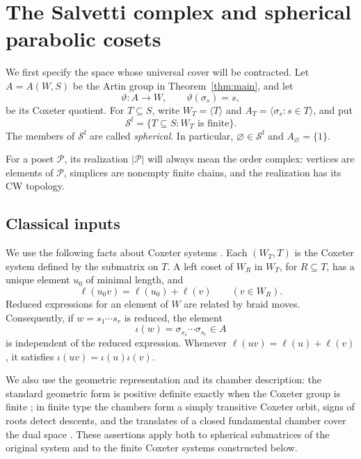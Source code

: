 \section{The Salvetti complex and spherical parabolic cosets}
\label{sec:topology}

We first specify the space whose universal cover will be contracted.
Let $A=A(W,S)$ be the Artin group in Theorem~\ref{thm:main}, and let
\[
  \vartheta\colon A\longrightarrow W,
  \qquad \vartheta(\sigma_s)=s,
\]
be its Coxeter quotient.  For $T\subseteq S$, write $W_T=\langle T\rangle$
and $A_T=\langle\sigma_s:s\in T\rangle$, and put
\[
  \mathcal S^{\mathrm f}
  =\{T\subseteq S:W_T\text{ is finite}\}.
\]
The members of $\mathcal S^{\mathrm f}$ are called \emph{spherical}.
In particular, $\varnothing\in\mathcal S^{\mathrm f}$ and
$A_{\varnothing}=\{1\}$.

For a poset $\mathcal P$, its realization $|\mathcal P|$ will always mean
the order complex: vertices are elements of $\mathcal P$, simplices are
nonempty finite chains, and the realization has its CW topology.

\subsection{Classical inputs}

We use the following facts about Coxeter systems
\cite[Chapter IV, \S1, nos.~4--5 and 8]{Bourbaki2002}.
Each $(W_T,T)$ is the Coxeter
system defined by the submatrix on $T$.  A left coset of $W_R$ in
$W_T$, for $R\subseteq T$, has a unique element $u_0$ of minimal length,
and
\begin{equation}
  \ell(u_0v)=\ell(u_0)+\ell(v)
  \qquad(v\in W_R).
  \label{eq:topology-length-additivity}
\end{equation}
Reduced expressions for an element of $W$ are related by braid moves.
Consequently, if $w=s_1\cdots s_r$ is reduced, the element
\begin{equation}
  \iota(w)=\sigma_{s_1}\cdots\sigma_{s_r}\in A
  \label{eq:topology-positive-lift}
\end{equation}
is independent of the reduced expression.  Whenever
$\ell(uv)=\ell(u)+\ell(v)$, it satisfies
$\iota(uv)=\iota(u)\iota(v)$.

We also use the geometric representation and its chamber description:
the standard geometric form is positive definite exactly when the
Coxeter group is finite
\cite[Chapter V, \S4, no.~8, Theorem 2]{Bourbaki2002};
in finite type the chambers form a simply
transitive Coxeter orbit, signs of roots detect descents, and the
translates of a closed fundamental chamber cover the dual space
\cite[Chapter V, \S3, no.~3, and \S4, nos.~4 and 6]{Bourbaki2002}.
These assertions apply both to spherical submatrices of the original
system and to the finite Coxeter systems constructed below.


